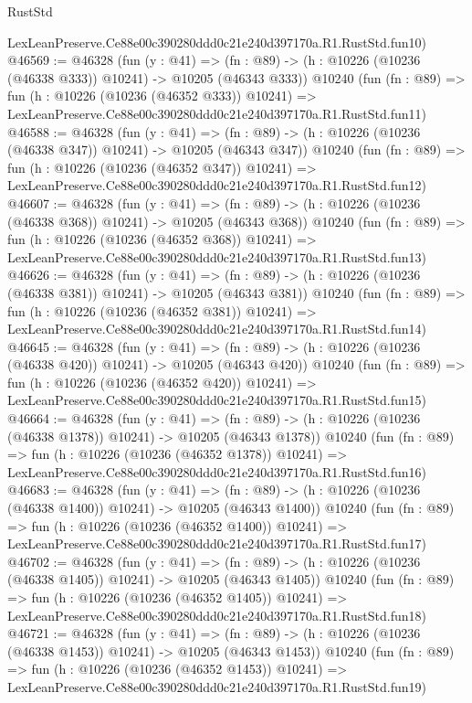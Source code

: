 \begin{lexlean}{RustStd}
\begin{coremodule}
    LexLeanPreserve.Ce88e00c390280ddd0c21e240d397170a.R1.RustStd.fun10)
@46569 := @46328
    (fun (y : @41) =>
    (fn : @89) -> (h : @10226 (@10236 (@46338 @333)) @10241) -> @10205 (@46343 @333))
    @10240
    (fun (fn : @89) =>
    fun (h : @10226 (@10236 (@46352 @333)) @10241) =>
    LexLeanPreserve.Ce88e00c390280ddd0c21e240d397170a.R1.RustStd.fun11)
@46588 := @46328
    (fun (y : @41) =>
    (fn : @89) -> (h : @10226 (@10236 (@46338 @347)) @10241) -> @10205 (@46343 @347))
    @10240
    (fun (fn : @89) =>
    fun (h : @10226 (@10236 (@46352 @347)) @10241) =>
    LexLeanPreserve.Ce88e00c390280ddd0c21e240d397170a.R1.RustStd.fun12)
@46607 := @46328
    (fun (y : @41) =>
    (fn : @89) -> (h : @10226 (@10236 (@46338 @368)) @10241) -> @10205 (@46343 @368))
    @10240
    (fun (fn : @89) =>
    fun (h : @10226 (@10236 (@46352 @368)) @10241) =>
    LexLeanPreserve.Ce88e00c390280ddd0c21e240d397170a.R1.RustStd.fun13)
@46626 := @46328
    (fun (y : @41) =>
    (fn : @89) -> (h : @10226 (@10236 (@46338 @381)) @10241) -> @10205 (@46343 @381))
    @10240
    (fun (fn : @89) =>
    fun (h : @10226 (@10236 (@46352 @381)) @10241) =>
    LexLeanPreserve.Ce88e00c390280ddd0c21e240d397170a.R1.RustStd.fun14)
@46645 := @46328
    (fun (y : @41) =>
    (fn : @89) -> (h : @10226 (@10236 (@46338 @420)) @10241) -> @10205 (@46343 @420))
    @10240
    (fun (fn : @89) =>
    fun (h : @10226 (@10236 (@46352 @420)) @10241) =>
    LexLeanPreserve.Ce88e00c390280ddd0c21e240d397170a.R1.RustStd.fun15)
@46664 := @46328
    (fun (y : @41) =>
    (fn : @89) -> (h : @10226 (@10236 (@46338 @1378)) @10241) -> @10205 (@46343 @1378))
    @10240
    (fun (fn : @89) =>
    fun (h : @10226 (@10236 (@46352 @1378)) @10241) =>
    LexLeanPreserve.Ce88e00c390280ddd0c21e240d397170a.R1.RustStd.fun16)
@46683 := @46328
    (fun (y : @41) =>
    (fn : @89) -> (h : @10226 (@10236 (@46338 @1400)) @10241) -> @10205 (@46343 @1400))
    @10240
    (fun (fn : @89) =>
    fun (h : @10226 (@10236 (@46352 @1400)) @10241) =>
    LexLeanPreserve.Ce88e00c390280ddd0c21e240d397170a.R1.RustStd.fun17)
@46702 := @46328
    (fun (y : @41) =>
    (fn : @89) -> (h : @10226 (@10236 (@46338 @1405)) @10241) -> @10205 (@46343 @1405))
    @10240
    (fun (fn : @89) =>
    fun (h : @10226 (@10236 (@46352 @1405)) @10241) =>
    LexLeanPreserve.Ce88e00c390280ddd0c21e240d397170a.R1.RustStd.fun18)
@46721 := @46328
    (fun (y : @41) =>
    (fn : @89) -> (h : @10226 (@10236 (@46338 @1453)) @10241) -> @10205 (@46343 @1453))
    @10240
    (fun (fn : @89) =>
    fun (h : @10226 (@10236 (@46352 @1453)) @10241) =>
    LexLeanPreserve.Ce88e00c390280ddd0c21e240d397170a.R1.RustStd.fun19)

\end{coremodule}
\end{lexlean}
